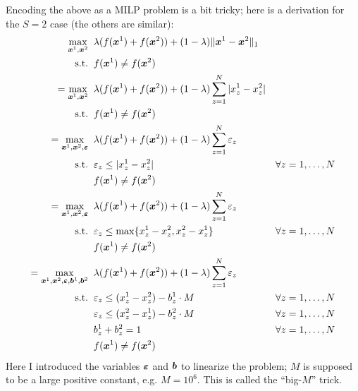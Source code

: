 \documentclass[12pt,a4paper]{article}
\begin{document}
\begin{itemize}
\begin{itemize}
                Encoding the above as a MILP problem is a bit tricky; here
                is a derivation for the $S=2$ case (the others are similar):
                \begin{align*}
                    \max_{\boldsymbol{x}^1, \boldsymbol{x}^2}
                        & \;\; \lambda (f(\boldsymbol{x}^1) + f(\boldsymbol{x}^2)) + (1 - \lambda) \|\boldsymbol{x}^1 - \boldsymbol{x}^2\|_1 \\
                    \text{s.t.}
                        & \;\; f(\boldsymbol{x}^1) \ne f(\boldsymbol{x}^2) \\
                    = \max_{\boldsymbol{x}^1, \boldsymbol{x}^2}
                        & \;\; \lambda (f(\boldsymbol{x}^1) + f(\boldsymbol{x}^2)) + (1 - \lambda) \sum_{z=1}^N |x^1_z - x^2_z| \\
                    \text{s.t.}
                        & \;\; f(\boldsymbol{x}^1) \ne f(\boldsymbol{x}^2) \\
                    = \max_{\boldsymbol{x}^1, \boldsymbol{x}^2, \boldsymbol{\varepsilon}}
                        & \;\; \lambda (f(\boldsymbol{x}^1) + f(\boldsymbol{x}^2)) + (1 - \lambda) \sum_{z=1}^N \varepsilon_z \\
                    \text{s.t.}
                        & \;\; \varepsilon_z \le |x^1_z - x^2_z|                            & \forall z = 1, \ldots, N \\
                        & \;\; f(\boldsymbol{x}^1) \ne f(\boldsymbol{x}^2) \\
                    = \max_{\boldsymbol{x}^1, \boldsymbol{x}^2, \boldsymbol{\varepsilon}}
                        & \;\; \lambda (f(\boldsymbol{x}^1) + f(\boldsymbol{x}^2)) + (1 - \lambda) \sum_{z=1}^N \varepsilon_z \\
                    \text{s.t.}
                        & \;\; \varepsilon_z \le \max \{ x^1_z - x^2_z, x^2_z - x^1_z \}    & \forall z = 1, \ldots, N \\
                        & \;\; f(\boldsymbol{x}^1) \ne f(\boldsymbol{x}^2) \\
                    = \max_{\boldsymbol{x}^1, \boldsymbol{x}^2, \boldsymbol{\varepsilon}, \boldsymbol{b}^1, \boldsymbol{b}^2}
                        & \;\; \lambda (f(\boldsymbol{x}^1) + f(\boldsymbol{x}^2)) + (1 - \lambda) \sum_{z=1}^N \varepsilon_z \\
                    \text{s.t.}
                        & \;\; \varepsilon_z \le (x^1_z - x^2_z) - b^1_z \cdot M            & \forall z = 1, \ldots, N \\
                        & \;\; \varepsilon_z \le (x^2_z - x^1_z) - b^2_z \cdot M            & \forall z = 1, \ldots, N \\
                        & \;\; b^1_z + b^2_z = 1                                            & \forall z = 1, \ldots, N \\
                        & \;\; f(\boldsymbol{x}^1) \ne f(\boldsymbol{x}^2)
                \end{align*}
                Here I introduced the variables $\boldsymbol{\varepsilon}$ and $\boldsymbol{b}$ to
                linearize the problem; $M$ is supposed to be a large positive
                constant, e.g. $M = 10^6$. This is called the ``big-$M$''
                trick.


\end{itemize}
\end{itemize}
\end{document}
